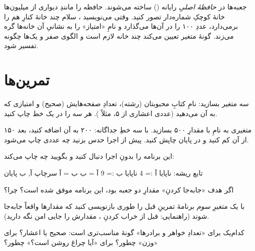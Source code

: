 \begin{deep}
جعبه‌ها در \emph{حافظهٔ اصلیِ} رایانه () ساخته می‌شوند. حافظه را
مانندِ دیواری از میلیون‌ها خانهٔ کوچکِ شماره‌دار تصور کنید. وقتی می‌نویسید
، سلام چند خانهٔ کنارِ هم را برمی‌دارد،
عددِ ۱۰۰ را در آن‌ها می‌گذارد و نامِ «امتیاز» را به نشانیِ آن خانه‌ها گره
می‌زند. گونهٔ متغیر تعیین می‌کند چند خانه لازم است و الگوی صفر و یک‌ها چگونه
تفسیر شود.
\end{deep}

\section{تمرین‌ها}

\exercise سه متغیر بسازید: نامِ کتابِ محبوبتان (رشته)، تعدادِ صفحه‌هایش
(صحیح) و امتیازی که به آن می‌دهید (عددی اعشاری از ۵، مثلاً ). هر سه را در یک خط چاپ
کنید.

\exercise متغیری به نامِ  با مقدارِ ۵۰۰ بسازید. با سه خطِ
جداگانه: ۲۰۰ به آن اضافه کنید، بعد ۱۵۰ از آن کم کنید و در پایان چاپش کنید.
پیش از اجرا حدس بزنید چه عددی چاپ می‌شود.

\exercise این برنامه را بدونِ اجرا دنبال کنید و بگویید چه چاپ می‌کند:
\begin{salamfa}
تابع ریشه:
    ناپایا آ := 4
    ناپایا ب := 9
    آ = ب
    ب = آ
    سرچاپ آ, ب
پایان
\end{salamfa}
اگر هدف «جابه‌جا کردنِ» مقدارِ دو جعبه بود، این برنامه موفق شده است؟ چرا؟

\exercise با یک متغیرِ \emph{سوم} برنامهٔ تمرینِ قبل را طوری بازنویسی کنید
که مقدارها واقعاً جابه‌جا شوند (راهنمایی: قبل از خراب کردنِ ،
مقدارش را جایی امن نگه دارید).

\exercise کدام‌یک برای «تعدادِ خواهر و برادرها» گونهٔ مناسب‌تری است: صحیح یا
اعشار؟ برای «وزن» چطور؟ برای «آیا چراغ روشن است؟» چطور؟
